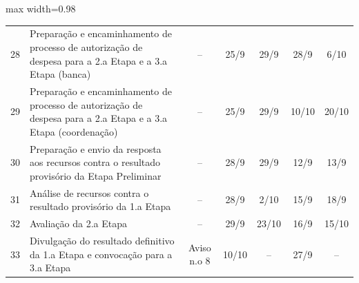 \begin{landscape}
\begin{quadro}[htb]
\begin{adjustbox}{max width=0.98\linewidth}
\begin{tabular}{|c|l|c|c|c|c|c|}
28 & Preparação e   encaminhamento de processo de autorização de despesa para a 2.a Etapa e a 3.a   Etapa (banca)                               & –                   & 25/9                                                                            & 29/9                                  & 28/9                                                                            & 6/10                 \\
29 & Preparação e   encaminhamento de processo de autorização de despesa para a 2.a Etapa e a 3.a   Etapa (coordenação)                         & –                   & 25/9                                                                            & 29/9                                  & 10/10                                                                           & 20/10                \\
30 & Preparação e envio da   resposta aos recursos contra o resultado provisório da Etapa Preliminar                                            & –                   & 28/9                                                                            & 29/9                                  & 12/9                                                                            & 13/9                 \\
\rowcolor[HTML]{FCD5B4} 
31 & Análise de recursos   contra o resultado provisório da 1.a Etapa                                                                           & –                   & 28/9                                                                            & 2/10                                  & 15/9                                                                            & 18/9                 \\
\rowcolor[HTML]{FCD5B4} 
32 & Avaliação da 2.a   Etapa                                                                                                                   & –                   & 29/9                                                                            & 23/10                                 & 16/9                                                                            & 15/10                \\
\rowcolor[HTML]{92CDDC} 
33 & Divulgação do   resultado definitivo da 1.a Etapa e convocação para a 3.a Etapa                                                            & Aviso n.o 8         & 10/10                                                                           & –                                     & 27/9                                                                            & –                    \\

\end{tabular}
\end{adjustbox}
\end{quadro}
\end{landscape}
